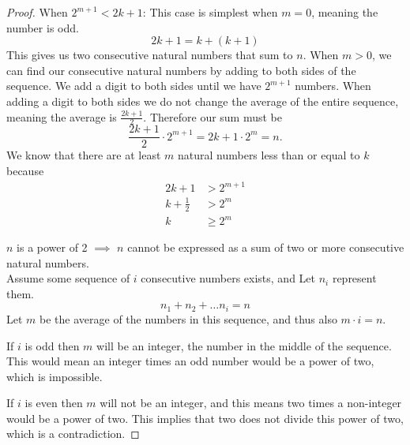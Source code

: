 \documentclass[12pt,a4paper,reqno,parskip=full]{amsart}
\numberwithin{equation}{section}
\theoremstyle{plain}
\theoremstyle{definition}
\renewcommand{\geq}{\geqslant}
\begin{document}
\begin{enumerate}
\begin{proof}
          When $2^{m + 1} < 2k + 1$:
          This case is simplest when $m = 0$, meaning the number is odd.
          \[2k + 1 = k + (k + 1)\]
          This gives us two consecutive natural numbers that sum to $n$. When $m > 0$, we can find
          our consecutive natural numbers by adding to both sides of the sequence. We add a digit to
          both sides until we have $2^{m+1}$ numbers. When adding a digit to both sides we do not
          change the average of the entire sequence, meaning the average is
          $\displaystyle\frac{2k + 1}{2}$.
          Therefore our sum must be
          \[\frac{2k + 1}{2} \cdot 2^{m+1} = {2k + 1} \cdot 2^m = n.\]
          We know that there are at least $m$ natural numbers less than or equal to $k$ because
          \begin{align*}
            2k + 1          & > 2^{m+1} \\
            k + \frac{1}{2} & > 2^m     \\
            k               & \geq 2^m
          \end{align*}

          $n$ is a power of 2 $\implies$
          $n$ cannot be expressed as a sum of two or more consecutive natural numbers. \\
          Assume some sequence of $i$ consecutive numbers exists, and Let $n_i$ represent them.
          \[n_1 + n_2 +\dots n_i = n\]
          Let $m$ be the average of the numbers in this sequence, and thus also $m \cdot i = n$.

          If $i$ is odd then $m$ will be an integer, the number in the middle of the sequence. This 
          would mean an integer times an odd number would be a power of two, which is impossible.

          If $i$ is even then $m$ will not be an integer, and this means two times a non-integer
          would be a power of two. This implies that two does not divide this power of two, which
          is a contradiction.
        \end{proof}
\end{enumerate}
\end{document}
